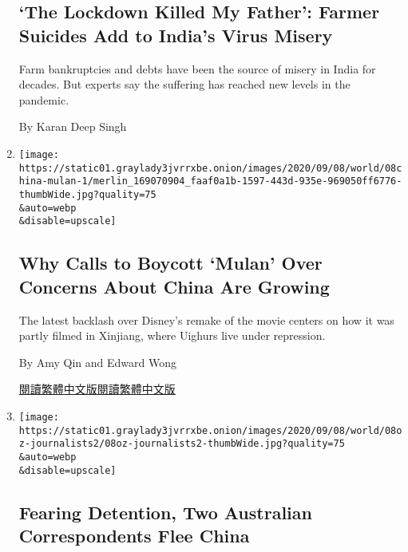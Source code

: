 \begin{enumerate}
  \hypertarget{the-lockdown-killed-my-father-farmer-suicides-add-to-indias-virus-misery}{%
  \subsection{`The Lockdown Killed My Father': Farmer Suicides Add to
  India's Virus
  Misery}\label{the-lockdown-killed-my-father-farmer-suicides-add-to-indias-virus-misery}}

  Farm bankruptcies and debts have been the source of misery in India
  for decades. But experts say the suffering has reached new levels in
  the pandemic.

  By Karan Deep Singh
\item
  \href{/2020/09/08/world/asia/china-mulan-xinjiang.html}{}

  \texttt{[image: https://static01.graylady3jvrrxbe.onion/images/2020/09/08/world/08china-mulan-1/merlin\_169070904\_faaf0a1b-1597-443d-935e-969050ff6776-thumbWide.jpg?quality=75\\\&auto=webp\\\&disable=upscale]}

  \hypertarget{why-calls-to-boycott-mulan-over-concerns-about-china-are-growing}{%
  \subsection{Why Calls to Boycott `Mulan' Over Concerns About China Are
  Growing}\label{why-calls-to-boycott-mulan-over-concerns-about-china-are-growing}}

  The latest backlash over Disney's remake of the movie centers on how
  it was partly filmed in Xinjiang, where Uighurs live under repression.

  By Amy Qin and Edward Wong

  \href{https://cn.nytimes3xbfgragh.onion/asia-pacific/20200909/china-mulan-xinjiang/}{閱讀繁體中文版}\href{https://cn.nytimes3xbfgragh.onion/asia-pacific/20200909/china-mulan-xinjiang/zh-hant/}{閱讀繁體中文版}
\item
  \href{/2020/09/07/world/australia/china-correspondents-bill-birtles-michael-smith.html}{}

  \texttt{[image: https://static01.graylady3jvrrxbe.onion/images/2020/09/08/world/08oz-journalists2/08oz-journalists2-thumbWide.jpg?quality=75\\\&auto=webp\\\&disable=upscale]}

  \hypertarget{fearing-detention-two-australian-correspondents-flee-china}{%
  \subsection{Fearing Detention, Two Australian Correspondents Flee
  China}\label{fearing-detention-two-australian-correspondents-flee-china}}


\end{enumerate}
